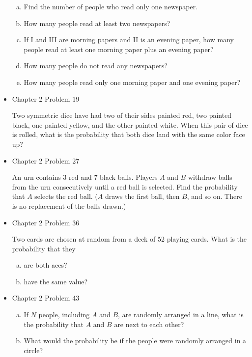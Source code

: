 \documentclass[11pt]{article}
\begin{document}
\begin{itemize}
    \begin{enumerate}[(a)]
    \item Find the number of people who read only one newspaper.
    \item How many people read at least two newspapers?
    \item If I and III are morning papers and II is an evening paper, how many people read at least one morning paper plus an evening paper?
    \item How many people do not read any newspapers?
    \item How many people read only one morning paper and one evening paper?
    \end{enumerate}
    

    \item
    Chapter 2 Problem  19
    
    Two symmetric dice have had two of their sides painted red, two painted black, one painted yellow, and the other painted white. When this pair of dice is rolled, what is the probability that both dice land with the same color face up?

    \item
    Chapter 2 Problem  27
    
    An urn contains 3 red and 7 black balls. Players $A$ and $B$ withdraw balls from the urn consecutively until a red ball is selected. Find the probability that $A$ selects the red ball. ($A$ draws the first ball, then $B$, and so on. There is no replacement of the balls drawn.)

    \item
    Chapter 2 Problem  36
    
    Two cards are chosen at random from a deck of 52 playing cards. What is the probability that they
    
    \begin{enumerate}[(a)]
    \item are both aces?
    \item have the same value?
    \end{enumerate}

    \item
    Chapter 2 Problem  43
    
    \begin{enumerate}[(a)]
    \item If $N$ people, including $A$ and $B$, are randomly arranged in a line, what is the probability that $A$ and $B$ are next to each other?
    \item What would the probability be if the people were randomly arranged in a circle?
    \end{enumerate}


\end{itemize}
\end{document}

